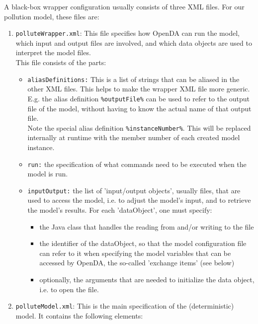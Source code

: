 A black-box wrapper configuration usually consists of three XML files. For our
pollution model, these files are:
\begin{enumerate}
   \item {\tt polluteWrapper.xml}: This file specifies how OpenDA can run the model, which input and output files are involved, and which data objects are used to interpret the model files.
     \\ This file
     consists of the parts:
     \begin{itemize}
        \item {\tt aliasDefinitions:} This is a list of strings that can be
          aliased in the other XML files. This helps to make the
          wrapper XML file more generic. E.g. the alias definition
          \verb|%outputFile%| can be used to refer to the output file of the model,
          without having to know the actual name of that output file.\\ Note
          the special alias definition \verb|%instanceNumber%|. This will be
          replaced internally at runtime with the member number of each created
          model instance.
        \item {\tt run:} the specification of what commands need to be executed
          when the model is run.
        \item {\tt inputOutput:} the list of 'input/output objects', usually
          files, that are used to access the model, i.e. to adjust the model's
          input, and to retrieve the model's results. For each 'dataObject', one
          must specify:
        \begin{itemize}
           \item the Java class that handles the reading from and/or writing to
             the file
           \item the identifier of the dataObject, so that the model
             configuration file can refer to it when specifying the model
             variables that can be accessed by OpenDA, the so-called 'exchange
             items' (see below)
           \item optionally, the arguments that are needed to initialize the
             data object, i.e. to open the file.
        \end{itemize}
     \end{itemize}
   \item {\tt polluteModel.xml}: This is the main specification of the
     (deterministic) model. It contains the following elements:
     \begin{itemize}

\end{itemize}
\end{enumerate}
